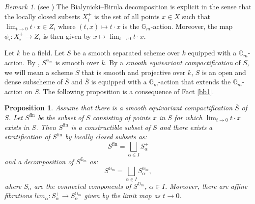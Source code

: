 \documentclass{amsart}
\newcommand{\gm}{\mathbb{G}_{m}}
\theoremstyle{plain}
\newtheorem{proposition}{Proposition}[section]
\theoremstyle{definition}
\theoremstyle{remark}
\newtheorem{remark}{Remark}[section]
\DeclareMathOperator{\fin}{fin}
\begin{document}
\begin{remark} \label{remark 1}
(see \cite[Section 3]{Bro}) The Bialynicki--Birula decomposition is explicit in the sense that the locally closed subsets $X_{i}^{+}$ is the set of all points $x \in X$ such that
$\lim_{t\to 0}t\cdot x \in Z_{i}$ where $(t, x) \mapsto t\cdot x$ is the $\mathbb{G}_{m}$-action. Moreover, the map $\phi_{i} : X_{i}^{+} \rightarrow Z_{i}$ is then given by $x \mapsto \lim_{t\to 0} t\cdot x$. 
\end{remark}
Let $k$ be a field. Let $S$ be a smooth separated %
scheme
over $k$ equipped with a $\mathbb{G}_{m}$-action. By \cite[Proposition A.8.10]{CGP}, $S^{\mathbb{G}_{m}}$ is smooth over $k$. By a \emph{smooth equivariant compactification} of $S$, we will mean a scheme $\overline{S}$ that is smooth and projective over $k$, $S$ is an open and dense subscheme of $\overline{S}$ and $\overline{S}$ is equipped with a $\mathbb{G}_{m}$-action that extends the $\mathbb{G}_{m}$-action on $S$. The following proposition is a consequence of Fact \ref{bb1}.
\begin{proposition}\label{proposition1}
Assume that there is a smooth equivariant compactification $\overline{S}$ of $S$.
Let $S^{\fin}$ be the subset of $S$ consisting of points $x$ in $S$ for which $\lim_{t\to 0}t\cdot x$ exists in $S$.
Then $S^{\fin}$ is a constructible subset of $S$ and there exists a stratification of $S^{\fin}$ by locally closed subsets as:
\[
S^{\fin}=\displaystyle\bigsqcup_{\alpha\in I}S^{+}_{\alpha}
\]
and a decomposition of $S^{\gm}$ as:
\[
S^{\gm}=\bigsqcup_{\alpha\in I}S_{\alpha}^{\gm},
\]
where $S_{\alpha}$ are the connected components of $S^{\gm}$, $\alpha\in I$. 
Moreover, there are affine fibrations $lim_{\alpha}:S_{\alpha}^{+}\rightarrow S_{\alpha}^{\gm}$ given by the limit map as $t\to 0$.
\end{proposition}
\end{document}
